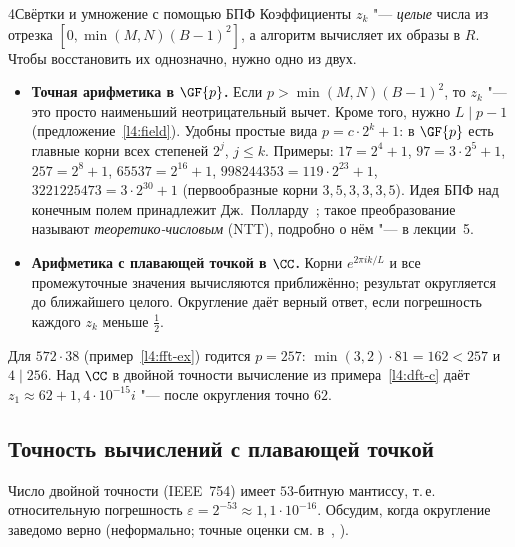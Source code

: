 \begin{lecture}{4}{Свёртки и умножение с помощью БПФ}
Коэффициенты $z_k$ "--- \emph{целые} числа из отрезка $[0, \min(M, N)(B-1)^2]$, а алгоритм
вычисляет их образы в $R$. Чтобы восстановить их однозначно, нужно одно из двух.

\begin{itemize}
  \item \textbf{Точная арифметика в $\GF{p}$.} Если $p > \min(M, N)(B - 1)^2$, то $z_k$ "---
    это просто наименьший неотрицательный вычет. Кроме того, нужно $L \mid p - 1$
    (предложение~\ref{l4:field}). Удобны простые вида $p = c \cdot 2^k + 1$: в $\GF{p}$ есть
    главные корни всех степеней $2^j$, $j \le k$. Примеры: $17 = 2^4 + 1$, $97 = 3 \cdot 2^5 + 1$,
    $257 = 2^8 + 1$, $65537 = 2^{16} + 1$, $998244353 = 119 \cdot 2^{23} + 1$,
    $3221225473 = 3 \cdot 2^{30} + 1$ (первообразные корни $3, 5, 3, 3, 3, 5$). Идея БПФ над
    конечным полем принадлежит Дж.~Полларду~\cite{pollard-fft}; такое преобразование называют
    \emph{теоретико-числовым} (NTT), подробно о нём "--- в лекции~5.
  \item \textbf{Арифметика с плавающей точкой в $\CC$.} Корни $e^{2\pi i k/L}$ и все промежуточные
    значения вычисляются приближённо; результат округляется до ближайшего целого. Округление
    даёт верный ответ, если погрешность каждого $z_k$ меньше $\frac12$.
\end{itemize}

\begin{example}
Для $572 \cdot 38$ (пример~\ref{l4:fft-ex}) годится $p = 257$: $\min(3, 2) \cdot 81 = 162 < 257$
и $4 \mid 256$. Над $\CC$ в двойной точности вычисление из примера~\ref{l4:dft-c} даёт
$z_1 \approx 62 + 1{,}4 \cdot 10^{-15} i$ "--- после округления точно $62$.
\end{example}


\subsection{Точность вычислений с плавающей точкой}

Число двойной точности (IEEE~754) имеет $53$-битную мантиссу, т.\,е. относительную погрешность
$\varepsilon = 2^{-53} \approx 1{,}1 \cdot 10^{-16}$. Обсудим, когда округление заведомо верно
(неформально; точные оценки см. в~\cite[разд.~9.5]{crandall-pomerance},
\cite[разд.~3.3]{brent-zimmermann}).


\end{lecture}
